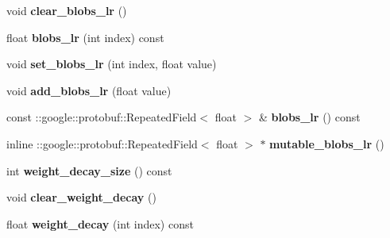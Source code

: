 \begin{DoxyCompactItemize}
\mbox{\label{classcaffe_1_1_v1_layer_parameter_a3efc8f84b6897c5ce0723bee65a76b22}} 
void {\bfseries clear\+\_\+blobs\+\_\+lr} ()
\item 
\mbox{\label{classcaffe_1_1_v1_layer_parameter_ad8cdd8936a590e67be575a98648a89ae}} 
float {\bfseries blobs\+\_\+lr} (int index) const
\item 
\mbox{\label{classcaffe_1_1_v1_layer_parameter_af3f28ac83432e374bb5356ae133d440d}} 
void {\bfseries set\+\_\+blobs\+\_\+lr} (int index, float value)
\item 
\mbox{\label{classcaffe_1_1_v1_layer_parameter_af1977763deecc574ab53e4864c98269f}} 
void {\bfseries add\+\_\+blobs\+\_\+lr} (float value)
\item 
\mbox{\label{classcaffe_1_1_v1_layer_parameter_a003c7f531be65bdd0ebf5a5947b47952}} 
const \+::google\+::protobuf\+::\+Repeated\+Field$<$ float $>$ \& {\bfseries blobs\+\_\+lr} () const
\item 
\mbox{\label{classcaffe_1_1_v1_layer_parameter_afd0d61abd7109cbc8c1f2da1a676582e}} 
inline \+::google\+::protobuf\+::\+Repeated\+Field$<$ float $>$ $\ast$ {\bfseries mutable\+\_\+blobs\+\_\+lr} ()
\item 
\mbox{\label{classcaffe_1_1_v1_layer_parameter_a88fb879785e76abfd20f37efab6b74bb}} 
int {\bfseries weight\+\_\+decay\+\_\+size} () const
\item 
\mbox{\label{classcaffe_1_1_v1_layer_parameter_a646489cb4bb8ced2cdfbee97a62bc412}} 
void {\bfseries clear\+\_\+weight\+\_\+decay} ()
\item 
\mbox{\label{classcaffe_1_1_v1_layer_parameter_a9f30f4976a26d877ae1208ec4dfc67db}} 
float {\bfseries weight\+\_\+decay} (int index) const
\item 
\mbox{\label{classcaffe_1_1_v1_layer_parameter_ab66339489d377143635fecba9570f037}} 

\end{DoxyCompactItemize}
